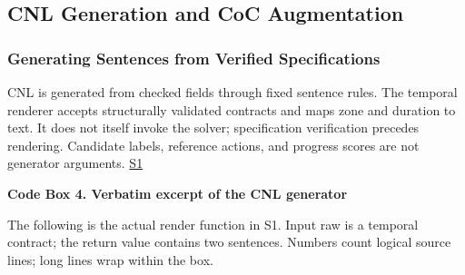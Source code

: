 \documentclass[nolineno]{ieeeaccess}
\begin{document}
\subsection{CNL Generation and CoC Augmentation}

\subsubsection{Generating Sentences from Verified Specifications}

CNL is generated from checked fields through fixed sentence rules. The temporal renderer accepts structurally validated contracts and maps zone and duration to text. It does not itself invoke the solver; specification verification precedes rendering. Candidate labels, reference actions, and progress scores are not generator arguments. \href{\detokenize{/home/jinhyun/prj_ws/prj_jin/guardsynth-cc/projects/04-guardsynth-coc/experiments/paper1_cnl_learning/temporal_preservation.py}}{S1}\par

\textbf{Code Box 4. Verbatim excerpt of the CNL generator}\par

The following is the actual render function in S1. Input raw is a temporal contract; the return value contains two sentences. Numbers count logical source lines; long lines wrap within the box.\par
\end{document}
